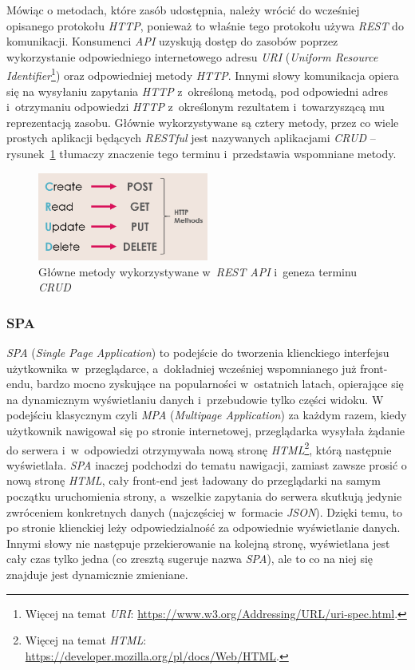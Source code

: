 Mówiąc o metodach, które zasób udostępnia, należy wrócić do wcześniej opisanego protokołu \emph{HTTP}, ponieważ to właśnie tego protokołu używa \emph{REST} do komunikacji. Konsumenci \emph{API} uzyskują dostęp do zasobów poprzez wykorzystanie odpowiedniego internetowego adresu \emph{URI} (\emph{Uniform Resource Identifier}\footnote{Więcej na temat \emph{URI}: \url{https://www.w3.org/Addressing/URL/uri-spec.html}.}) oraz odpowiedniej metody \emph{HTTP}. Innymi słowy komunikacja opiera się na wysyłaniu zapytania \emph{HTTP} z~określoną metodą, pod odpowiedni adres i~otrzymaniu odpowiedzi \emph{HTTP} z~określonym rezultatem i~towarzyszącą mu reprezentacją zasobu. Głównie wykorzystywane są cztery metody, przez co wiele prostych aplikacji będących \emph{RESTful} jest nazywanych aplikacjami \emph{CRUD} -- rysunek~\ref{fig:crudExample} tłumaczy znaczenie tego terminu i~przedstawia wspomniane metody. 
\begin{figure}
    \centering
    \includegraphics[width=0.5\textwidth,height=0.5\textheight,keepaspectratio]{./assets/crudExample.png}
    \caption{Główne metody wykorzystywane w~\emph{REST API} i~geneza terminu \emph{CRUD}~\cite{CRUD}}
    \label{fig:crudExample}
\end{figure}

\subsubsection{SPA}
\label{sec:spa}
\emph{SPA} (\emph{Single Page Application}) to podejście do tworzenia klienckiego interfejsu użytkownika w~przeglądarce, a~dokładniej wcześniej wspomnianego już front-endu, bardzo mocno zyskujące na popularności w~ostatnich latach, opierające się na dynamicznym wyświetlaniu danych i~przebudowie tylko części widoku. W podejściu klasycznym czyli \emph{MPA} (\emph{Multipage Application}) za każdym razem, kiedy użytkownik nawigował się po stronie internetowej, przeglądarka wysyłała żądanie do serwera i~w~odpowiedzi otrzymywała nową stronę \emph{HTML}\footnote{Więcej na temat \emph{HTML}: \url{https://developer.mozilla.org/pl/docs/Web/HTML}.}, którą następnie wyświetlała. \emph{SPA} inaczej podchodzi do tematu nawigacji, zamiast zawsze prosić o nową stronę \emph{HTML}, cały front-end jest ładowany do przeglądarki na samym początku uruchomienia strony, a~wszelkie zapytania do serwera skutkują jedynie zwróceniem konkretnych danych (najczęściej w~formacie \emph{JSON}). Dzięki temu, to po stronie klienckiej leży odpowiedzialność za odpowiednie wyświetlanie danych. Innymi słowy nie następuje przekierowanie na kolejną stronę, wyświetlana jest cały czas tylko jedna (co zresztą sugeruje nazwa \emph{SPA}), ale to co na niej się znajduje jest dynamicznie zmieniane. 

